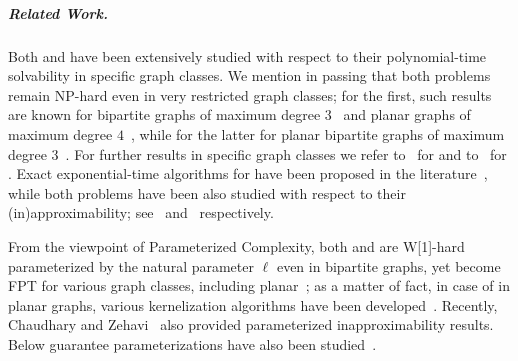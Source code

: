 \subparagraph{Related Work.}
Both {\InducedM} and {\AcyclicM} have been extensively studied with respect to their polynomial-time
solvability in specific graph classes.
We mention in passing that both problems remain NP-hard even in very restricted graph classes;
for the first, such results are known for bipartite graphs of maximum degree $3$~\cite{ipl/Lozin02}
and planar graphs of maximum degree $4$~\cite{siamdm/KoS03},
while for the latter for planar bipartite graphs of maximum degree $3$~\cite{tcs/HajebiJ23}.
For further results in specific graph classes we refer to~\cite{tcs/BrandstadtES07,algorithmica/BrandstadtH08,dam/Cameron89,dm/CameronST03,dam/Chang03,dmtcs/EkimD13,dam/GolumbicL00,algorithmica/HabibM20,algorithmica/KlemzR22,siamdm/KoS03,algorithmica/KoblerR03,dam/KrishnamurthyS12,ipl/Lozin02,wg/Zito99}
for {\InducedM} and to~\cite{dam/BasteR18,tcs/HajebiJ23,tcs/PandaC23,dmaa/PandaP12} for \AcyclicM.
Exact exponential-time algorithms for {\InducedM} have been proposed in the literature~\cite{ol/ChangCH15,iandc/XiaoT17},
while both problems have been also studied with respect to their (in)approximability;
see~\cite{disopt/BasteFR20,soda/ChalermsookLN13,focs/ChalermsookLN13,tcs/ChlebikC06,iandc/ChlebikC08,jda/DuckworthMZ05,soda/ElbassioniRRS09,tcs/FurstLR18,dam/LinMV18,disopt/OrlovichFGZ08,tcs/Rautenbach15}
and~\cite{dm/BasteFR22,dam/BasteR18,anor/FurstR19,tcs/PandaC23} respectively.

From the viewpoint of Parameterized Complexity,
both {\InducedM} and {\AcyclicM} are W[1]-hard parameterized by the natural parameter $\ell$ even in bipartite graphs,
yet become FPT for various graph classes, including planar~\cite{tcs/DabrowskiDL13,tcs/HajebiJ23,dam/MoserS09};
as a matter of fact, in case of {\InducedM} in planar graphs, various kernelization algorithms have been developed~\cite{dam/ErmanKKW10,jcss/KanjPSX11}.
Recently, Chaudhary and Zehavi~\cite{jcss/ChaudharyZ25} also provided parameterized inapproximability results.
Below guarantee parameterizations have also been studied~\cite{jcss/ChaudharyZ25,stacs/Koana23,jda/MoserT09,tcs/XiaoK20}.

